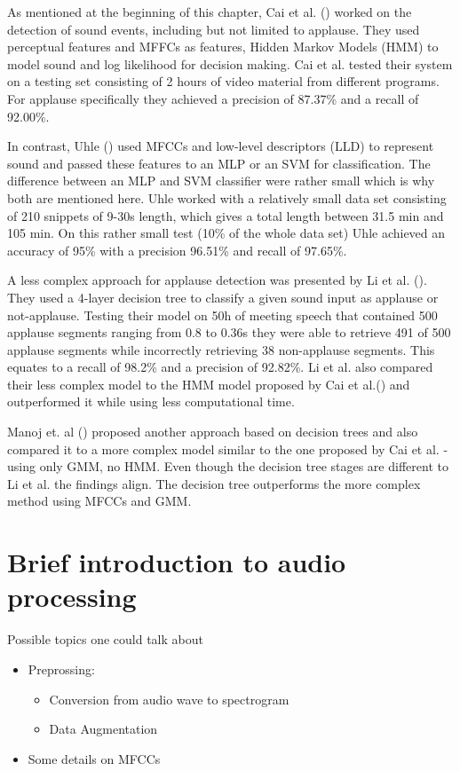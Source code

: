 \documentclass[bsc,frontabs,parskip,deptreport]{infthesis}
\begin{document}
As mentioned at the beginning of this chapter, Cai et al. (\cite{cai2003highlight}) worked on the detection of sound events, including but not limited to applause.
They used perceptual features and MFFCs as features, Hidden Markov Models (HMM) to model sound and log likelihood for decision making. Cai et al. tested their system on a testing set consisting of 2 hours of video material from different programs. For applause specifically they achieved a precision of 87.37\% and a recall of 92.00\%.

In contrast, Uhle (\cite{uhle2011applause}) used MFCCs and low-level descriptors (LLD) to represent sound and passed these features to an MLP or an SVM for classification. The difference between an MLP and SVM classifier were rather small which is why both are mentioned here. Uhle worked with a relatively small data set consisting of 210 snippets of 9-30s length, which gives a total length between 31.5 min and 105 min. On this rather small test (10\% of the whole data set) Uhle achieved an accuracy of 95\% with a precision 96.51\% and recall of 97.65\%.

A less complex approach for applause detection was presented by Li et al. (\cite{li2009characteristics}). They used a 4-layer decision tree to classify a given sound input as applause or not-applause. Testing their model on 50h of meeting speech that contained 500 applause segments ranging from 0.8 to 0.36s they were able to retrieve 491 of 500 applause segments while incorrectly retrieving 38 non-applause segments. This equates to a recall of 98.2\% and a precision of 92.82\%. Li et al. also compared their less complex model to the HMM model proposed by Cai et al.(\cite{cai2003highlight}) and outperformed it while using less computational time.

Manoj et. al (\cite{manoj2011novel}) proposed another approach based on decision trees and also compared it to a more complex model similar to the one proposed by Cai et al. - using only GMM, no HMM. Even though the decision tree stages are different to Li et al. the findings align. The decision tree outperforms the more complex method using MFCCs and GMM.  

\section{Brief introduction to audio processing} \label{theory}
Possible topics one could talk about
\begin{itemize}
    \item Preprossing: 
    \begin{itemize}
        \item Conversion from audio wave to spectrogram 
        \item Data Augmentation
    \end{itemize}
    \item Some details on MFCCs 
\end{itemize}
\end{document}
